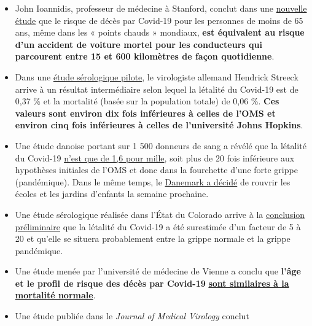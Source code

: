 \begin{itemize}
\tightlist
\item
  John Ioannidis, professeur de médecine à Stanford, conclut dans une
  \href{https://www.medrxiv.org/content/10.1101/2020.04.05.20054361v1}{nouvelle
  étude} que le risque de décès par Covid-19 pour les personnes de moins
  de 65 ans, même dans les « points chauds » mondiaux, \textbf{est
  équivalent au risque d'un accident de voiture mortel pour les
  conducteurs qui parcourent entre 15 et 600 kilomètres de façon
  quotidienne}.
\item
  Dans une
  \href{https://www.land.nrw/sites/default/files/asset/document/zwischenergebnis_covid19_case_study_gangelt_0.pdf}{étude
  sérologique pilote}, le virologiste allemand Hendrick Streeck arrive à
  un résultat intermédiaire selon lequel la létalité du Covid-19 est de
  0,37 \% et la mortalité (basée sur la population totale) de 0,06 \%.
  \textbf{Ces valeurs sont environ dix fois inférieures à celles de
  l'OMS et environ cinq fois inférieures à celles de l'université Johns
  Hopkins}.
\item
  Une étude danoise portant sur 1 500 donneurs de sang a révélé que la
  létalité du Covid-19
  \href{https://www.dr.dk/nyheder/indland/doedelighed-skal-formentlig-taelles-i-promiller-danske-blodproever-kaster-nyt-lys}{n'est
  que de 1,6 pour mille}, soit plus de 20 fois inférieure aux hypothèses
  initiales de l'OMS et donc dans la fourchette d'une forte grippe
  (pandémique). Dans le même temps, le
  \href{https://www.thelocal.dk/20200406/denmark-to-reopen-schools-and-kindergartens-next-week}{Danemark
  a décidé} de rouvrir les écoles et les jardins d'enfants la semaine
  prochaine.
\item
  Une étude sérologique réalisée dans l'État du Colorado arrive à la
  \href{https://reason.com/2020/04/08/mass-antibody-testing-in-this-rural-colorado-county-sheds-light-on-covid-19s-prevalence-and-lethality/}{conclusion
  préliminaire} que la létalité du Covid-19 a été surestimée d'un
  facteur de 5 à 20 et qu'elle se situera probablement entre la grippe
  normale et la grippe pandémique.
\item
  Une étude menée par l'université de médecine de Vienne a conclu que
  \textbf{l'âge et le profil de risque des décès par Covid-19}
  \href{https://www.vienna.at/analyse-zeigt-covid-19-opferkurve-entspricht-normaler-mortalitaet/6581246}{\textbf{sont
  similaires à la mortalité normale}}.
\item
  Une étude publiée dans le \emph{Journal of Medical Virology} conclut

\end{itemize}
